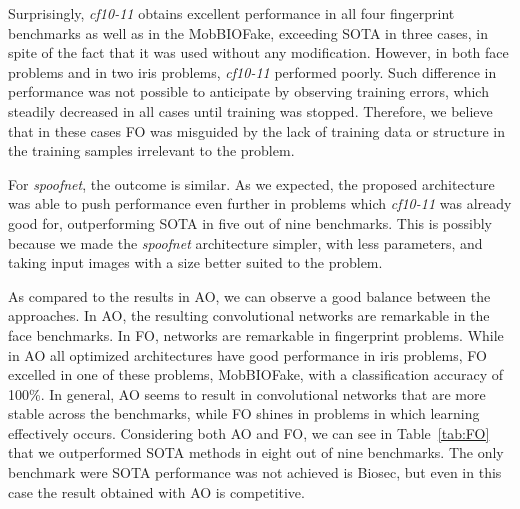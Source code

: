 Surprisingly, \emph{cf10-11} obtains excellent performance in all four fingerprint benchmarks as well as in the MobBIOFake, exceeding SOTA in three cases, in spite of the fact that it was used without any modification. However, in both face problems and in two iris problems, \emph{cf10-11} performed poorly. Such difference in performance was not possible to anticipate by observing training errors, which steadily decreased in all cases until training was stopped. Therefore, we believe that in these cases FO was misguided by the lack of training data or structure in the training samples irrelevant to the problem.


For \emph{spoofnet}, the outcome is similar. As we expected, the proposed architecture was able to push performance even further in problems which \emph{cf10-11} was already good for, outperforming SOTA in five out of nine benchmarks. This is possibly because we made the \emph{spoofnet} architecture simpler, with less parameters, and taking input images with a size better suited to the problem.

As compared to the results in AO, we can observe a good balance between the approaches. In AO, the resulting convolutional networks are remarkable in the face benchmarks. In FO, networks are remarkable in fingerprint problems. While in AO all optimized architectures have good performance in iris problems, FO excelled in one of these problems, MobBIOFake, with a classification accuracy of 100\%. In general, AO seems to result in convolutional networks that are more stable across the benchmarks, while FO shines in problems in which learning effectively occurs. Considering both AO and FO, we can see in Table~\ref{tab:FO} that we outperformed SOTA methods in eight out of nine benchmarks. The only benchmark were SOTA performance was not achieved is Biosec, but even in this case the result obtained with AO is competitive. 

